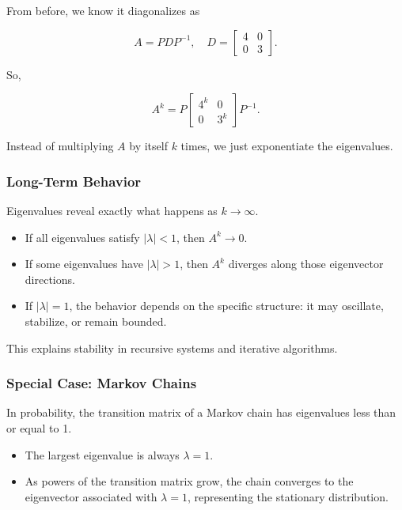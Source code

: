 \documentclass[
  letterpaper,
  DIV=11,
  numbers=noendperiod]{scrreprt}
\providecommand{\tightlist}{%
  \setlength{\itemsep}{0pt}\setlength{\parskip}{0pt}}
\begin{document}
From before, we know it diagonalizes as

\[
A = P D P^{-1}, \quad D = \begin{bmatrix} 4 & 0 \\ 0 & 3 \end{bmatrix}.
\]

So,

\[
A^k = P \begin{bmatrix} 4^k & 0 \\ 0 & 3^k \end{bmatrix} P^{-1}.
\]

Instead of multiplying \(A\) by itself \(k\) times, we just exponentiate
the eigenvalues.

\subsubsection{Long-Term Behavior}\label{long-term-behavior}

Eigenvalues reveal exactly what happens as \(k \to \infty\).

\begin{itemize}
\tightlist
\item
  If all eigenvalues satisfy \(|\lambda| < 1\), then \(A^k \to 0\).
\item
  If some eigenvalues have \(|\lambda| > 1\), then \(A^k\) diverges
  along those eigenvector directions.
\item
  If \(|\lambda| = 1\), the behavior depends on the specific structure:
  it may oscillate, stabilize, or remain bounded.
\end{itemize}

This explains stability in recursive systems and iterative algorithms.

\subsubsection{Special Case: Markov
Chains}\label{special-case-markov-chains}

In probability, the transition matrix of a Markov chain has eigenvalues
less than or equal to 1.

\begin{itemize}
\tightlist
\item
  The largest eigenvalue is always \(\lambda = 1\).
\item
  As powers of the transition matrix grow, the chain converges to the
  eigenvector associated with \(\lambda = 1\), representing the
  stationary distribution.
\end{itemize}
\end{document}
